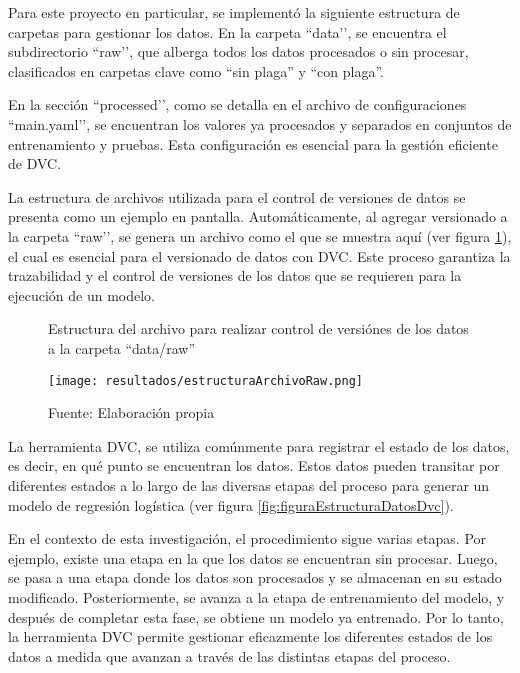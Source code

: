 Para este proyecto en particular, se implementó la siguiente estructura de carpetas para gestionar los datos. En la carpeta ``data’’, se encuentra el subdirectorio ``raw’’, que alberga todos los datos procesados o sin procesar, clasificados en carpetas clave como ``sin plaga'' y ``con plaga''.

En la sección ``processed’’, como se detalla en el archivo de configuraciones ``main.yaml’’, se encuentran los valores ya procesados y separados en conjuntos de entrenamiento y pruebas. Esta configuración es esencial para la gestión eficiente de DVC.

La estructura de archivos utilizada para el control de versiones de datos se presenta como un ejemplo en pantalla. Automáticamente, al agregar versionado a la carpeta ``raw’’, se genera un archivo como el que se muestra aquí (ver figura \ref{fig:figuraEstructuraArchivoRaw}), el cual es esencial para el versionado de datos con DVC. Este proceso garantiza la trazabilidad y el control de versiones de los datos que se requieren para la ejecución de un modelo.

\newpage

\begin{figure}[h]
\centering
\caption{Estructura del archivo para realizar control de versiónes de los datos a la carpeta ``data/raw''}
\texttt{[image: resultados/estructuraArchivoRaw.png]}
\caption*{\footnotesize Fuente: Elaboración propia}
\label{fig:figuraEstructuraArchivoRaw}
\end{figure}

La herramienta DVC, se utiliza comúnmente para registrar el estado de los datos, es decir, en qué punto se encuentran los datos. Estos datos pueden transitar por diferentes estados a lo largo de las diversas etapas del proceso para generar un modelo de regresión logística (ver figura \ref{fig:figuraEstructuraDatosDvc}).

En el contexto de esta investigación, el procedimiento sigue varias etapas. Por ejemplo, existe una etapa en la que los datos se encuentran sin procesar. Luego, se pasa a una etapa donde los datos son procesados y se almacenan en su estado modificado. Posteriormente, se avanza a la etapa de entrenamiento del modelo, y después de completar esta fase, se obtiene un modelo ya entrenado. Por lo tanto, la herramienta DVC permite gestionar eficazmente los diferentes estados de los datos a medida que avanzan a través de las distintas etapas del proceso.

\newpage

